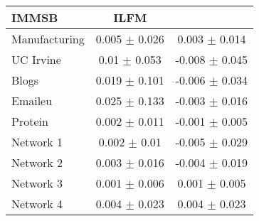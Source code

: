 \begin{tabular}{@{}lcc@{}}
\toprule

\textbf{IMMSB} & \textbf{ILFM} \\\midrule

Manufacturing & 0.005 \(\pm\) 0.026 & 0.003 \(\pm\) 0.014 \\
UC Irvine & 0.01 \(\pm\) 0.053 & -0.008 \(\pm\) 0.045 \\
Blogs & 0.019 \(\pm\) 0.101 & -0.006 \(\pm\) 0.034 \\
Emaileu & 0.025 \(\pm\) 0.133 & -0.003 \(\pm\) 0.016 \\
Protein & 0.002 \(\pm\) 0.011 & -0.001 \(\pm\) 0.005 \\
Network 1 & 0.002 \(\pm\) 0.01 & -0.005 \(\pm\) 0.029 \\
Network 2 & 0.003 \(\pm\) 0.016 & -0.004 \(\pm\) 0.019 \\
Network 3 & 0.001 \(\pm\) 0.006 & 0.001 \(\pm\) 0.005 \\
Network 4 & 0.004 \(\pm\) 0.023 & 0.004 \(\pm\) 0.023 \\

\bottomrule
\end{tabular}
